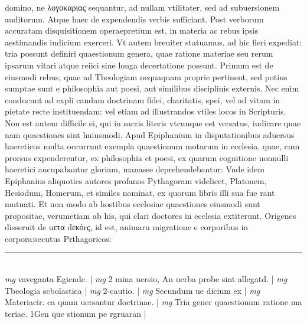\documentclass{article}
\begin{document}
\begin{pages}
domino, ne λογοκαριας sequantur, ad nullam vtilitater, sed ad subuersionem auditorum. Atque  haec de expendendis verbis sufficiant. Post verborum accuratam disquisitionem operaepretium est, in materia ac rebus ipsis aestimandis iudicium exerceri. Vt autem breuiter statuamus, ad hic fieri expediat: tria possunt definiri quaestionum genera, quae ratione materiae seu rerum ipsarum vitari atque  reiici sine longa decertatione possunt. Primum est de eiusmodi rebus, quae ad Theologiam nequaquam proprie pertinent, sed potius sumptae sunt e philosophia aut poesi, aut similibus disciplinis externis. Nec enim conducunt ad expli candam doctrinam fidei, charitatis, spei, vel ad vitam in pietate recte instituendam: vel etiam ad illustrandos vtiles locos in Scripturis. Non est autem difficile ei, qui in sacris literis vtcunque  est versatus, iudicare quae nam quaestiones sint huiusmodi. Apud Epiphanium in disputationibus aduersus haereticos multa occurrunt exempla quaestionum motarum in ecclesia, quae, cum prorsus expenderentur, ex philosophia et poesi, ex quarum cognitione nonnulli haeretici aucupabantur gloriam, manasse deprehendebantur: Vnde idem Epiphanius aliquoties autores profanos Pythagoram videlicet, Platonem, Hesiodum, Homerum, et similes nominat, ex quorum libris illi sua fue rant mutuati. Et non modo ab hostibus ecclesiae quaestiones eiusmodi sunt propositae, verumetiam ab his, qui clari doctores in ecclesia extiterunt. Origenes disseruit de uετα dεκόrς, id est, animaru migratione e corporibus in corpora:secutus Prthagoricos:  \pend
\vspace{0.5cm}\noindent
\vspace{0.2cm}\rule{1cm}{0.2pt}\\ 
\hspace{0.2cm}\textit{mg}
\footnotesize vaveganta Egiende. 
\normalsize| 
\hspace{0.2cm}\textit{mg}
\footnotesize 2 mina uersio, An uerba probe sint allegatd. 
\normalsize| 
\hspace{0.2cm}\textit{mg}
\footnotesize Tbeologia scbolastica 
\normalsize| 
\hspace{0.2cm}\textit{mg}
\footnotesize 2-cautio. 
\normalsize| 
\hspace{0.2cm}\textit{mg}
\footnotesize Secundum ue dicium ex 
\normalsize| 
\hspace{0.2cm}\textit{mg}
\footnotesize Materiacir. ca quam uersantur doctrinae. 
\normalsize| 
\hspace{0.2cm}\textit{mg}
\footnotesize Tria gener quaestionum ratione ma teriae. 1Gen que stionum pe rgruaran 
\normalsize| 

\end{pages}
\end{document}
